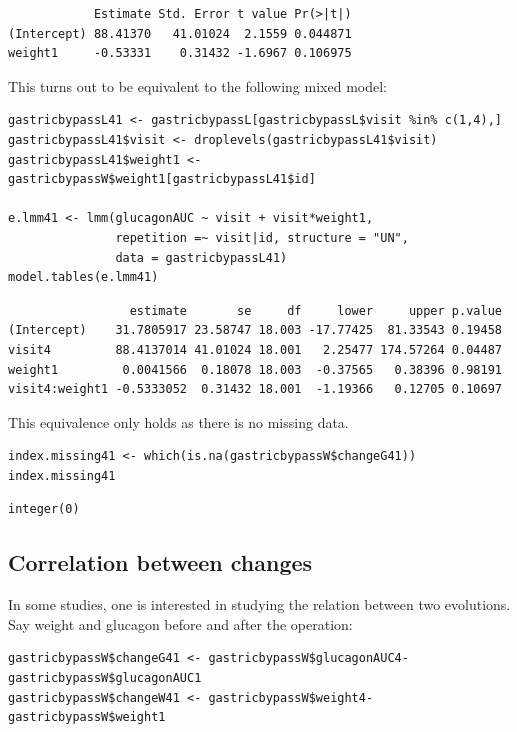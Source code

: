 \documentclass[12pt]{article}
\begin{document}
\begin{verbatim}
            Estimate Std. Error t value Pr(>|t|)
(Intercept) 88.41370   41.01024  2.1559 0.044871
weight1     -0.53331    0.31432 -1.6967 0.106975
\end{verbatim}


This turns out to be equivalent to the following mixed model:
\lstset{language=r,label= ,caption= ,captionpos=b,numbers=none}
\begin{lstlisting}
gastricbypassL41 <- gastricbypassL[gastricbypassL$visit %in% c(1,4),]
gastricbypassL41$visit <- droplevels(gastricbypassL41$visit)
gastricbypassL41$weight1 <- gastricbypassW$weight1[gastricbypassL41$id]

e.lmm41 <- lmm(glucagonAUC ~ visit + visit*weight1,
               repetition =~ visit|id, structure = "UN",
               data = gastricbypassL41)
model.tables(e.lmm41)
\end{lstlisting}

\begin{verbatim}
                 estimate       se     df     lower     upper p.value
(Intercept)    31.7805917 23.58747 18.003 -17.77425  81.33543 0.19458
visit4         88.4137014 41.01024 18.001   2.25477 174.57264 0.04487
weight1         0.0041566  0.18078 18.003  -0.37565   0.38396 0.98191
visit4:weight1 -0.5333052  0.31432 18.001  -1.19366   0.12705 0.10697
\end{verbatim}


This equivalence only holds as there is no missing data.
\lstset{language=r,label= ,caption= ,captionpos=b,numbers=none}
\begin{lstlisting}
index.missing41 <- which(is.na(gastricbypassW$changeG41))
index.missing41
\end{lstlisting}

\begin{verbatim}
integer(0)
\end{verbatim}


\clearpage

\subsection{Correlation between changes}
\label{sec:orga2e8f46}

In some studies, one is interested in studying the relation between
two evolutions. Say weight and glucagon before and after the
operation:
\lstset{language=r,label= ,caption= ,captionpos=b,numbers=none}
\begin{lstlisting}
gastricbypassW$changeG41 <- gastricbypassW$glucagonAUC4-gastricbypassW$glucagonAUC1
gastricbypassW$changeW41 <- gastricbypassW$weight4-gastricbypassW$weight1
\end{lstlisting}
\end{document}
